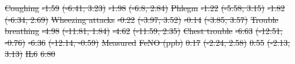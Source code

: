 \documentclass[
  letterpaper,
  DIV=11,
  numbers=noendperiod]{scrartcl}
\makeatletter
\renewenvironment{table}%
   {\renewcommand\familydefault\sfdefault
    \@float{table}}
   {\end@float}
\providecommand{\DIFdel}[1]{{\protect\color{red}\sout{#1}}}                      %
\providecommand{\DIFdelFL}[1]{\DIFdel{#1}} %
\makeatother
\begin{document}
\begin{table}
\DIFdelFL{\hspace{1em} }%
\DIFdelFL{Coughing }%
\DIFdelFL{-1.59 }%
\DIFdelFL{(-6.41, 3.23) }%
\DIFdelFL{-1.98 }%
\DIFdelFL{(-6.8, 2.84)}%
\DIFdelFL{\hspace{1em} }%
\DIFdelFL{Phlegm }%
\DIFdelFL{-1.22 }%
\DIFdelFL{(-5.58, 3.15) }%
\DIFdelFL{-1.82 }%
\DIFdelFL{(-6.34, 2.69)}%
\DIFdelFL{\hspace{1em} }%
\DIFdelFL{Wheezing attacks }%
\DIFdelFL{-0.22 }%
\DIFdelFL{(-3.97, 3.52) }%
\DIFdelFL{-0.14 }%
\DIFdelFL{(-3.85, 3.57)}%
\DIFdelFL{\hspace{1em} }%
\DIFdelFL{Trouble breathing }%
\DIFdelFL{-4.98 }%
\DIFdelFL{(-11.81, 1.84) }%
\DIFdelFL{-4.62 }%
\DIFdelFL{(-11.59, 2.35)}%
\DIFdelFL{Chest trouble }%
\DIFdelFL{-6.63 }%
\DIFdelFL{(-12.51, -0.76) }%
\DIFdelFL{-6.36 }%
\DIFdelFL{(-12.14, -0.59)}%
\DIFdelFL{\hspace{1em}Measured }%
\DIFdelFL{FeNO (ppb) }%
\DIFdelFL{0.17 }%
\DIFdelFL{(-2.24, 2.58) }%
\DIFdelFL{0.55 }%
\DIFdelFL{(-2.13, 3.13)}%
\DIFdelFL{\hspace{1em} }%
\DIFdelFL{IL6 }%
\DIFdelFL{6.80 }%

\end{table}
\end{document}
